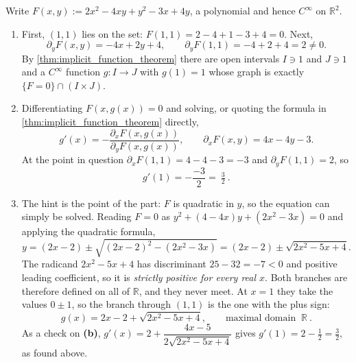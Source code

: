 \begin{exercisesolution}
\label{sol:kobel_conic_implicit_maximal_interval}
Write $F(x,y) := 2x^2 - 4xy + y^2 - 3x + 4y$, a polynomial and hence $C^\infty$ on
$\mathbb{R}^2$.

\begin{enumerate}[label=\textbf{(\alph*)}]
  \item First, $(1,1)$ lies on the set: $F(1,1) = 2 - 4 + 1 - 3 + 4 = 0$. Next,
    \[\partial_yF(x,y) = -4x + 2y + 4, \qquad \partial_yF(1,1) = -4+2+4 = 2 \neq 0.\]
    By \cref{thm:implicit_function_theorem} there are open intervals $I \ni 1$ and $J \ni 1$ and a
    $C^\infty$ function $g : I \to J$ with $g(1)=1$ whose graph is exactly
    $\{F=0\} \cap (I\times J)$.

  \item Differentiating $F(x,g(x)) = 0$ and solving, or quoting the formula in
    \cref{thm:implicit_function_theorem} directly,
    \[g'(x) = -\frac{\partial_xF(x,g(x))}{\partial_yF(x,g(x))},
      \qquad \partial_xF(x,y) = 4x - 4y - 3 .\]
    At the point in question $\partial_xF(1,1) = 4-4-3 = -3$ and $\partial_yF(1,1) = 2$, so
    \[g'(1) = -\frac{-3}{2} = \boxed{\ \tfrac32\ }.\]

  \item The hint is the point of the part: $F$ is quadratic in $y$, so the equation can simply
    be solved. Reading $F=0$ as $y^2 + (4-4x)y + (2x^2-3x) = 0$ and applying the quadratic formula,
    \[y = (2x-2) \pm \sqrt{(2x-2)^2 - (2x^2-3x)} = (2x-2) \pm \sqrt{2x^2-5x+4}.\]
    The radicand $2x^2-5x+4$ has discriminant $25 - 32 = -7 < 0$ and positive leading coefficient,
    so it is \emph{strictly positive for every real $x$}. Both branches are therefore defined on
    all of $\mathbb{R}$, and they never meet. At $x=1$ they take the values $0 \pm 1$, so the
    branch through $(1,1)$ is the one with the plus sign:
    \[g(x) = 2x - 2 + \sqrt{2x^2-5x+4}, \qquad \text{maximal domain } \boxed{\ \mathbb{R}\ }.\]
    As a check on \textbf{(b)}, $g'(x) = 2 + \dfrac{4x-5}{2\sqrt{2x^2-5x+4}}$ gives
    $g'(1) = 2 - \tfrac12 = \tfrac32$, as found above.
\end{enumerate}


\end{exercisesolution}
